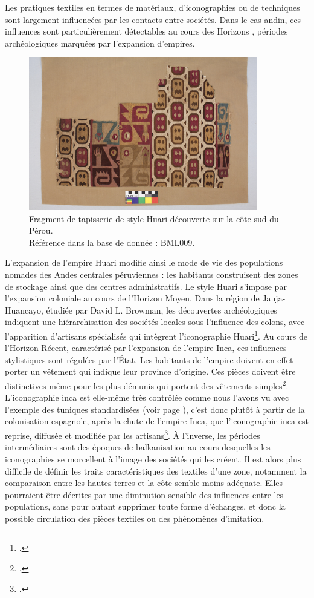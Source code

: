 Les pratiques textiles en termes de matériaux, d'iconographies ou de techniques sont largement influencées par les contacts entre sociétés. Dans le cas andin, ces influences sont particulièrement détectables au cours des \og Horizons \fg, périodes archéologiques marquées par l'expansion d'empires.  
\begin{figure}[!ht]
       \begin{center}
        		\includegraphics[width=10cm]{../images/BML009_IMG_3240.jpg}
	\end{center}
    \caption{Fragment de tapisserie de style Huari découverte sur la côte sud du Pérou.\\ Référence dans la base de donnée : BML009.}
    \label{fig:BML009}
\end{figure}
L'expansion de l'empire Huari modifie ainsi le mode de vie des populations nomades des Andes centrales péruviennes : les habitants construisent des zones de stockage ainsi que des centres administratifs. Le style Huari s'impose par l'expansion coloniale au cours de l'Horizon Moyen. Dans la région de Jauja-Huancayo, étudiée par David L. Browman, les découvertes archéologiques indiquent une hiérarchisation des sociétés locales sous l'influence des colons, avec l'apparition d'artisans spécialisés qui intègrent l'iconographie Huari\footcite[p.~191]{browmanPastoralNomadismAndes1974}. 
Au cours de l'Horizon Récent, caractérisé par l'expansion de l'empire Inca, ces influences stylistiques sont régulées par l'État. Les habitants de l'empire doivent en effet porter un vêtement qui indique leur province d'origine. Ces pièces doivent être distinctives même pour les plus démunis qui portent des vêtements simples\footcite[p.~193]{cousinRobeFemmeOrigine2016}. L'iconographie inca est elle-même très contrôlée comme nous l'avons vu avec l'exemple des tuniques standardisées (voir page \pageref{fig:damier}), c'est donc plutôt à partir de la colonisation espagnole, après la chute de l'empire Inca, que l'iconographie inca est reprise, diffusée et modifiée par les artisans\footcite[p.~53]{nilesArtistEmpireInca1994}. À l'inverse, les périodes intermédiaires sont des époques de balkanisation au cours desquelles les iconographies se morcellent à l'image des sociétés qui les créent. Il est alors plus difficile de définir les traits caractéristiques des textiles d'une zone, notamment la comparaison entre les hautes-terres et la côte semble moins adéquate. Elles pourraient être décrites par une diminution sensible des influences entre les populations, sans pour autant supprimer toute forme d'échanges, et donc la possible circulation des pièces textiles ou des phénomènes d'imitation.

